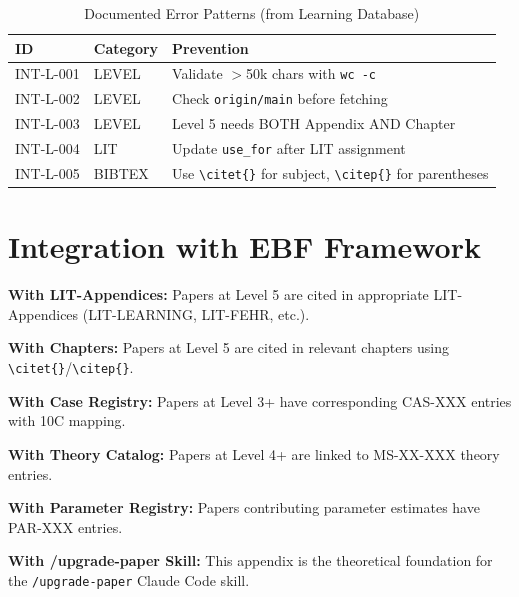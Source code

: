 \begin{table}[htbp]
\centering
\caption{Documented Error Patterns (from Learning Database)}
\label{tab:error-patterns}
\renewcommand{\arraystretch}{1.3}
\begin{tabular}{@{}llp{6cm}@{}}
\toprule
\textbf{ID} & \textbf{Category} & \textbf{Prevention} \\
\midrule
INT-L-001 & LEVEL & Validate $>$50k chars with \texttt{wc -c} \\
INT-L-002 & LEVEL & Check \texttt{origin/main} before fetching \\
INT-L-003 & LEVEL & Level 5 needs BOTH Appendix AND Chapter \\
INT-L-004 & LIT & Update \texttt{use\_for} after LIT assignment \\
INT-L-005 & BIBTEX & Use \texttt{\textbackslash citet\{\}} for subject, \texttt{\textbackslash citep\{\}} for parentheses \\
\bottomrule
\end{tabular}
\end{table}


\section{Integration with EBF Framework}
\label{sec:paperint-ebf-integration}

\begin{tcolorbox}[colback=yellow!5!white, colframe=yellow!75!black,
    title=Integration: METHOD-PAPERINT $\leftrightarrow$ Other Components]

\textbf{With LIT-Appendices:}
Papers at Level 5 are cited in appropriate LIT-Appendices (LIT-LEARNING, LIT-FEHR, etc.).

\textbf{With Chapters:}
Papers at Level 5 are cited in relevant chapters using \texttt{\textbackslash citet\{\}}/\texttt{\textbackslash citep\{\}}.

\textbf{With Case Registry:}
Papers at Level 3+ have corresponding CAS-XXX entries with 10C mapping.

\textbf{With Theory Catalog:}
Papers at Level 4+ are linked to MS-XX-XXX theory entries.

\textbf{With Parameter Registry:}
Papers contributing parameter estimates have PAR-XXX entries.

\textbf{With /upgrade-paper Skill:}
This appendix is the theoretical foundation for the \texttt{/upgrade-paper} Claude Code skill.

\end{tcolorbox}

